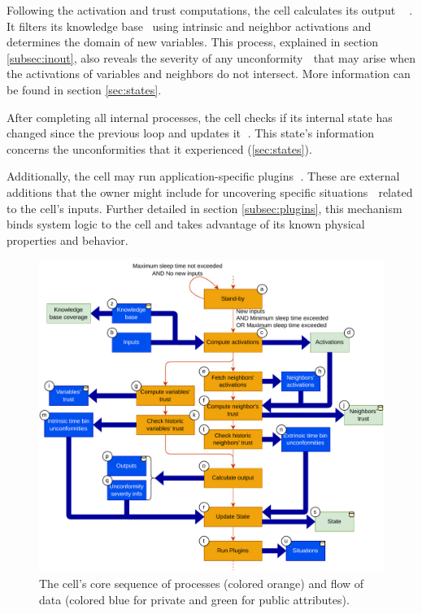 Following the activation and trust computations, the cell calculates its output \textcircled{} \textcircled{}. It filters its knowledge base \ using intrinsic and neighbor activations and determines the domain of new variables. This process, explained in section \ref{subsec:inout}, also reveals the severity of any unconformity \textcircled{} that may arise when the activations of variables and neighbors do not intersect. More information can be found in section \ref{sec:states}.

After completing all internal processes, the cell checks if its internal state has changed since the previous loop and updates it \textcircled{}. This state's information \textcircled{} concerns the unconformities that it experienced (\ref{sec:states}).

Additionally, the cell may run application-specific plugins \textcircled{}. These are external additions that the owner might include for uncovering specific situations \textcircled{} related to the cell's inputs. Further detailed in section \ref{subsec:plugins}, this mechanism binds system logic to the cell and takes advantage of its known physical properties and behavior.

\begin{figure}[h!]
    \centering
    \includegraphics[width=\textwidth]{figures/chapter4/cell/processes.pdf}
    \caption{The cell's core sequence of processes (colored orange) and flow of data (colored blue for private and green for public attributes).}
    \label{fig:cellprocesses}
\end{figure}

